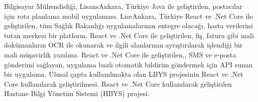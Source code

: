 \documentclass[
    10pt,
    A4,
    english,
    draft = false,
    twoside = false,
]{article}
\begin{document}

	{Bilgisayar Mühendisliği, Lisans}{Ankara, Türkiye}
    {
      {Java ile geliştirilen, postacılar için rota planlama mobil uygulaması.}
    }
	{Lise}{Ankara, Türkiye}{}
    {
      {React ve .Net Core ile geliştirilen, tüm Sağlık Bakanlığı uygulamalarının entegre olacağı, hasta verilerini tutan merkezi bir platform.}
      {React ve .Net Core ile geliştirilen, fiş, fatura gibi mali dokümanların OCR ile okunarak  ve ilgili alanlarının ayrıştırılarak işlendiği bir mali müşavirlik yazılımı.}
      {React ve .Net Core ile geliştirilen,, SMS ve e-posta gönderimi sağlayan, uygulama bazlı otomatik bildirim göndermek için API sunan bir uygulama.}
    }
    {
      {Ulusal çapta kullanılmakta olan LBYS projesinin React ve .Net Core kullanılarak geliştirilmesi.}
      {React ve .Net Core kullanılarak geliştirilen Hastane Bilgi Yönetim Sistemi (HBYS) projesi.}
    }
\end{document}

